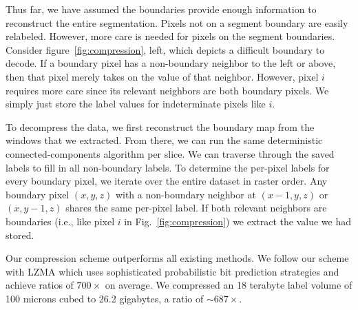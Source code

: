 Thus far, we have assumed the boundaries provide enough information to reconstruct the entire segmentation.
Pixels not on a segment boundary are easily relabeled.
However, more care is needed for pixels on the segment boundaries. 
Consider figure~\ref{fig:compression}, left, which depicts a difficult boundary to decode. 
If a boundary pixel has a non-boundary neighbor to the left or above, then that pixel merely takes on the value of that neighbor. 
However, pixel $i$ requires more care since its relevant neighbors are both boundary pixels. 
We simply just store the label values for indeterminate pixels like $i$.

To decompress the data, we first reconstruct the boundary map from the windows that we extracted.
From there, we can run the same deterministic connected-components algorithm per slice.
We can traverse through the saved labels to fill in all non-boundary labels.
To determine the per-pixel labels for every boundary pixel, we iterate over the entire dataset in raster order. 
Any boundary pixel $(x, y, z)$ with a non-boundary neighbor at $(x - 1, y, z)$ or $(x, y - 1, z)$ shares the same per-pixel label. 
If both relevant neighbors are boundaries (i.e., like pixel $i$ in Fig.~\ref{fig:compression}) we extract the value we had stored.

Our compression scheme outperforms all existing methods.
We follow our scheme with LZMA which uses sophisticated probabilistic bit prediction strategies and achieve ratios of $700\times$ on average.
We compressed an 18 terabyte label volume of 100 microns cubed to 26.2 gigabytes, a ratio of $\sim687\times$. 
